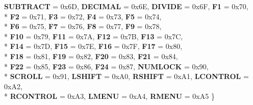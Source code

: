 \begin{DoxyCompactItemize}
{\bfseries S\-U\-B\-T\-R\-A\-C\-T} = 0x6\-D, 
{\bfseries D\-E\-C\-I\-M\-A\-L} = 0x6\-E, 
{\bfseries D\-I\-V\-I\-D\-E} = 0x6\-F, 
{\bfseries F1} = 0x70, 
\\*
{\bfseries F2} = 0x71, 
{\bfseries F3} = 0x72, 
{\bfseries F4} = 0x73, 
{\bfseries F5} = 0x74, 
\\*
{\bfseries F6} = 0x75, 
{\bfseries F7} = 0x76, 
{\bfseries F8} = 0x77, 
{\bfseries F9} = 0x78, 
\\*
{\bfseries F10} = 0x79, 
{\bfseries F11} = 0x7\-A, 
{\bfseries F12} = 0x7\-B, 
{\bfseries F13} = 0x7\-C, 
\\*
{\bfseries F14} = 0x7\-D, 
{\bfseries F15} = 0x7\-E, 
{\bfseries F16} = 0x7\-F, 
{\bfseries F17} = 0x80, 
\\*
{\bfseries F18} = 0x81, 
{\bfseries F19} = 0x82, 
{\bfseries F20} = 0x83, 
{\bfseries F21} = 0x84, 
\\*
{\bfseries F22} = 0x85, 
{\bfseries F23} = 0x86, 
{\bfseries F24} = 0x87, 
{\bfseries N\-U\-M\-L\-O\-C\-K} = 0x90, 
\\*
{\bfseries S\-C\-R\-O\-L\-L} = 0x91, 
{\bfseries L\-S\-H\-I\-F\-T} = 0x\-A0, 
{\bfseries R\-S\-H\-I\-F\-T} = 0x\-A1, 
{\bfseries L\-C\-O\-N\-T\-R\-O\-L} = 0x\-A2, 
\\*
{\bfseries R\-C\-O\-N\-T\-R\-O\-L} = 0x\-A3, 
{\bfseries L\-M\-E\-N\-U} = 0x\-A4, 
{\bfseries R\-M\-E\-N\-U} = 0x\-A5
 \}
\end{DoxyCompactItemize}

